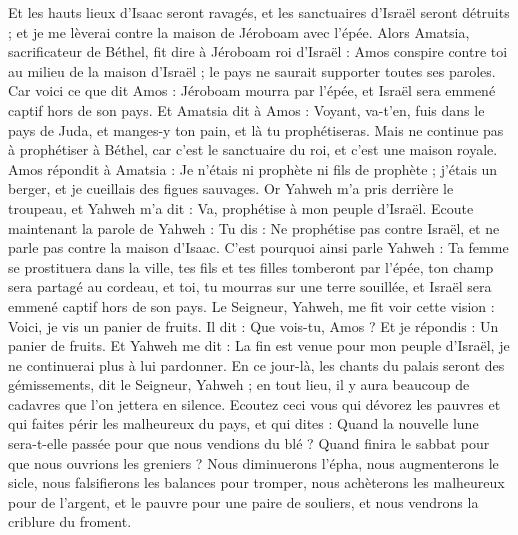 \begin{multicols}{2}
Et les hauts lieux d'Isaac seront ravagés, et les sanctuaires d'Israël seront détruits ; et je me lèverai contre la maison de Jéroboam avec l'épée.
Alors Amatsia, sacrificateur de Béthel, fit dire à Jéroboam roi d'Israël : Amos conspire contre toi au milieu de la maison d'Israël ; le pays ne saurait supporter toutes ses paroles.
Car voici ce que dit Amos : Jéroboam mourra par l'épée, et Israël sera emmené captif hors de son pays.
Et Amatsia dit à Amos : Voyant, va-t’en, fuis dans le pays de Juda, et manges-y ton pain, et là tu prophétiseras.
Mais ne continue pas à prophétiser à Béthel, car c'est le sanctuaire du roi, et c'est une maison royale.
Amos répondit à Amatsia : Je n'étais ni prophète ni fils de prophète ; j'étais un berger, et je cueillais des figues sauvages.
Or Yahweh m’a pris derrière le troupeau, et Yahweh m’a dit : Va, prophétise à mon peuple d'Israël.
Ecoute maintenant la parole de Yahweh : Tu dis : Ne prophétise pas contre Israël, et ne parle pas contre la maison d'Isaac.
C'est pourquoi ainsi parle Yahweh : Ta femme se prostituera dans la ville, tes fils et tes filles tomberont par l'épée, ton champ sera partagé au cordeau, et toi, tu mourras sur une terre souillée, et Israël sera emmené captif hors de son pays.
\VerseOne{}Le Seigneur, Yahweh, me fit voir cette vision : Voici, je vis un panier de fruits.
Il dit : Que vois-tu, Amos ? Et je répondis : Un panier de fruits. Et Yahweh me dit : La fin est venue pour mon peuple d'Israël, je ne continuerai plus à lui pardonner.
En ce jour-là, les chants du palais seront des gémissements, dit le Seigneur, Yahweh ; en tout lieu, il y aura beaucoup de cadavres que l'on jettera en silence.
Ecoutez ceci vous qui dévorez les pauvres et qui faites périr les malheureux du pays,
et qui dites : Quand la nouvelle lune sera-t-elle passée pour que nous vendions du blé ? Quand finira le sabbat pour que nous ouvrions les greniers ? Nous diminuerons l’épha, nous augmenterons le sicle, nous falsifierons les balances pour tromper,
nous achèterons les malheureux pour de l’argent, et le pauvre pour une paire de souliers, et nous vendrons la criblure du froment.

\end{multicols}
